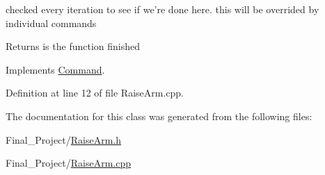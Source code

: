 checked every iteration to see if we're done here. this will be overrided by individual commands 

\begin{DoxyReturn}{Returns}
is the function finished 
\end{DoxyReturn}


Implements \hyperlink{classCommand_a9aa704d5f9d98f510a79e645701dc72a}{Command}.



Definition at line 12 of file Raise\-Arm.\-cpp.



The documentation for this class was generated from the following files\-:\begin{DoxyCompactItemize}
\item 
Final\-\_\-\-Project/\hyperlink{RaiseArm_8h}{Raise\-Arm.\-h}\item 
Final\-\_\-\-Project/\hyperlink{RaiseArm_8cpp}{Raise\-Arm.\-cpp}\end{DoxyCompactItemize}
